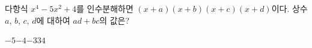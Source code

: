 다항식 $x^4-5x^2+4$를 인수분해하면 $(x+a)(x+b)(x+c)(x+d)$이다. 상수 $a$, $b$, $c$, $d$에 대하여 $ad+bc$의 값은? 
\begin{choices32}{$-5$}{$-4$}{$-3$}{$3$}{$4$}\end{choices32}
